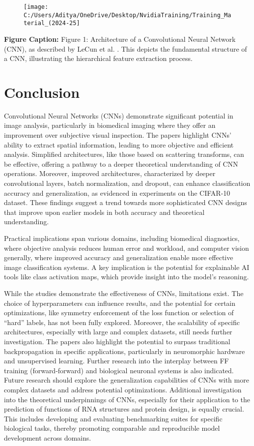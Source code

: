 \documentclass{article}
\begin{document}
\begin{figure}[h]
\centering
\texttt{[image: C:/Users/Aditya/OneDrive/Desktop/NvidiaTraining/Training\_Material\_(2024-25]}
\end{figure}


\textbf{Figure Caption:} Figure 1: Architecture of a Convolutional Neural Network (CNN), as described by LeCun et al. \cite{7}.  This depicts the fundamental structure of a CNN, illustrating the hierarchical feature extraction process.


\section*{Conclusion}
Convolutional Neural Networks (CNNs) demonstrate significant potential in image analysis, particularly in biomedical imaging where they offer an improvement over subjective visual inspection.  The papers highlight CNNs' ability to extract spatial information, leading to more objective and efficient analysis.  Simplified architectures, like those based on scattering transforms, can be effective, offering a pathway to a deeper theoretical understanding of CNN operations.  Moreover, improved architectures, characterized by deeper convolutional layers, batch normalization, and dropout, can enhance classification accuracy and generalization, as evidenced in experiments on the CIFAR-10 dataset.  These findings suggest a trend towards more sophisticated CNN designs that improve upon earlier models in both accuracy and theoretical understanding.

Practical implications span various domains, including biomedical diagnostics, where objective analysis reduces human error and workload, and computer vision generally, where improved accuracy and generalization enable more effective image classification systems.  A key implication is the potential for explainable AI tools like class activation maps, which provide insight into the model's reasoning.

While the studies demonstrate the effectiveness of CNNs, limitations exist.  The choice of hyperparameters can influence results, and the potential for certain optimizations, like symmetry enforcement of the loss function or selection of “hard” labels, has not been fully explored.  Moreover, the scalability of specific architectures, especially with large and complex datasets, still needs further investigation.  The papers also highlight the potential to surpass traditional backpropagation in specific applications, particularly in neuromorphic hardware and unsupervised learning.  Further research into the interplay between FF training (forward-forward) and biological neuronal systems is also indicated.  Future research should explore the generalization capabilities of CNNs with more complex datasets and address potential optimizations.  Additional investigation into the theoretical underpinnings of CNNs, especially for their application to the prediction of functions of RNA structures and protein design, is equally crucial.  This includes developing and evaluating benchmarking suites for specific biological tasks, thereby promoting comparable and reproducible model development across domains.
\end{document}
